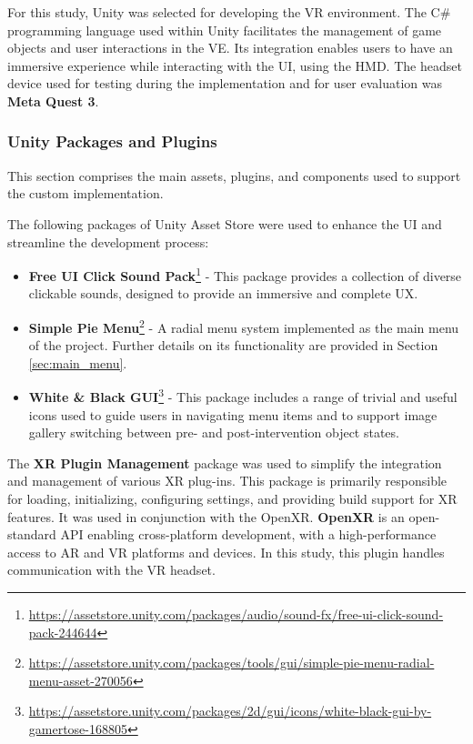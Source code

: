 For this study, Unity was selected for developing the \gls{VR} environment. The C\# programming language used within Unity facilitates the management of game objects and user interactions in the \gls{VE}.
Its integration enables users to have an immersive experience while interacting with the \gls{UI}, using the \gls{HMD}.
The headset device used for testing during the implementation and for user evaluation was \textbf{Meta Quest 3}.

\subsubsection{Unity Packages and Plugins}
This section comprises the main assets, plugins, and components used to support the custom implementation.

The following packages of Unity Asset Store were used to enhance the \gls{UI} and streamline the development process:

\begin{itemize}
\item{\textbf{Free UI Click Sound Pack}\footnote{\url{https://assetstore.unity.com/packages/audio/sound-fx/free-ui-click-sound-pack-244644}} - This package provides a collection of diverse clickable sounds, designed to provide an immersive and complete \gls{UX}.}
\item{\textbf{Simple Pie Menu}\footnote{\url{https://assetstore.unity.com/packages/tools/gui/simple-pie-menu-radial-menu-asset-270056}}} - A radial menu system implemented as the main menu of the project. Further details on its functionality are provided in Section \ref{sec:main_menu}.
\item{\textbf{White \& Black GUI}\footnote{\url{https://assetstore.unity.com/packages/2d/gui/icons/white-black-gui-by-gamertose-168805}}} - This package includes a range of trivial and useful icons used to guide users in navigating menu items and to support image gallery switching between pre- and post-intervention object states.
\end{itemize}



The \textbf{XR Plugin Management} package was used to simplify the integration and management of various XR plug-ins. 
This package is primarily responsible for loading, initializing, configuring settings, and providing build support for XR features. 
It was used in conjunction with the OpenXR. \textbf{OpenXR} is an open-standard \gls{API} enabling cross-platform development, with a high-performance access to \gls{AR} and \gls{VR} platforms and devices. In this study, this plugin handles communication with the \gls{VR} headset.

